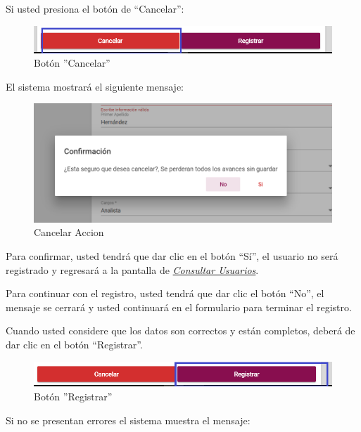     \newpage
            Si usted presiona el botón de “Cancelar”:

            \begin{figure}[!hbtp]
                \centering
                \hypertarget{cancel1}{\includegraphics[width=0.7\linewidth]{images/SP5/BtnCancelar1}}
                \caption{Botón ''Cancelar''}
                \label{cancel1}
            \end{figure}

            El sistema mostrará el siguiente mensaje:


             \begin{figure}[!hbtp]
            	\centering
            \includegraphics[width=0.4\linewidth]{images/SP5/MSG29}
            	\caption{Cancelar Accion}
            	\label{mensaje29}
            \end{figure}

            Para confirmar, usted tendrá que dar clic en el botón “Sí”, el usuario no será registrado y regresará a la pantalla de \hyperlink{consultarUs}{\textit{Consultar Usuarios}}.

            Para continuar con el registro, usted tendrá que  dar clic el botón “No”, el mensaje se  cerrará y usted continuará en el formulario para terminar el registro.

            Cuando usted considere que los datos son correctos y están completos, deberá de dar clic en el botón “Registrar”.

            \begin{figure}[!hbtp]
                \centering
                \hypertarget{btnreg}{\includegraphics[width=0.7\linewidth]{images/SP5/BtnRegistrar}}
                \caption{Botón ''Registrar''}
                \label{btnreg}
            \end{figure}

            Si no se presentan errores el sistema muestra el mensaje:

